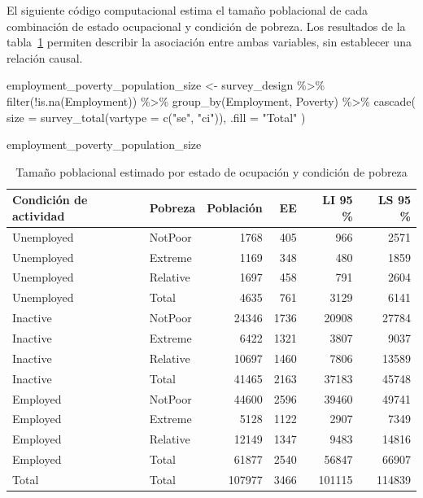 \documentclass[
  spanish,
  11pt,
  letterpaper,
  oneside,
  open=any]{scrbook}
\newenvironment{Shaded}{\begin{snugshade}}{\end{snugshade}}
\newcommand{\AttributeTok}[1]{\textcolor[rgb]{0.40,0.45,0.13}{#1}}
\newcommand{\FunctionTok}[1]{\textcolor[rgb]{0.28,0.35,0.67}{#1}}
\newcommand{\NormalTok}[1]{\textcolor[rgb]{0.00,0.23,0.31}{#1}}
\newcommand{\OtherTok}[1]{\textcolor[rgb]{0.00,0.23,0.31}{#1}}
\newcommand{\SpecialCharTok}[1]{\textcolor[rgb]{0.37,0.37,0.37}{#1}}
\newcommand{\StringTok}[1]{\textcolor[rgb]{0.13,0.47,0.30}{#1}}
\begin{document}
El siguiente código computacional estima el tamaño poblacional de cada
combinación de estado ocupacional y condición de pobreza. Los resultados
de la tabla~\ref{tbl-tamano-empleo-pobreza} permiten describir la
asociación entre ambas variables, sin establecer una relación causal.

\begin{Shaded}
\begin{Highlighting}[]
\NormalTok{employment\_poverty\_population\_size }\OtherTok{\textless{}{-}}\NormalTok{ survey\_design }\SpecialCharTok{\%\textgreater{}\%}
  \FunctionTok{filter}\NormalTok{(}\SpecialCharTok{!}\FunctionTok{is.na}\NormalTok{(Employment)) }\SpecialCharTok{\%\textgreater{}\%}
  \FunctionTok{group\_by}\NormalTok{(Employment, Poverty) }\SpecialCharTok{\%\textgreater{}\%}
  \FunctionTok{cascade}\NormalTok{(}
    \AttributeTok{size =} \FunctionTok{survey\_total}\NormalTok{(}\AttributeTok{vartype =} \FunctionTok{c}\NormalTok{(}\StringTok{"se"}\NormalTok{, }\StringTok{"ci"}\NormalTok{)),}
    \AttributeTok{.fill =} \StringTok{"Total"}
\NormalTok{  )}

\NormalTok{employment\_poverty\_population\_size}
\end{Highlighting}
\end{Shaded}

{

\begin{longtable}[]{@{}llrrrr@{}}

\caption{\label{tbl-tamano-empleo-pobreza}Tamaño poblacional estimado
por estado de ocupación y condición de pobreza}

\tabularnewline

\toprule\noalign{}
Condición de actividad & Pobreza & Población & EE & LI 95 \% & LS 95
\% \\
\midrule\noalign{}
\endhead
\bottomrule\noalign{}
\endlastfoot
Unemployed & NotPoor & 1768 & 405 & 966 & 2571 \\
Unemployed & Extreme & 1169 & 348 & 480 & 1859 \\
Unemployed & Relative & 1697 & 458 & 791 & 2604 \\
Unemployed & Total & 4635 & 761 & 3129 & 6141 \\
Inactive & NotPoor & 24346 & 1736 & 20908 & 27784 \\
Inactive & Extreme & 6422 & 1321 & 3807 & 9037 \\
Inactive & Relative & 10697 & 1460 & 7806 & 13589 \\
Inactive & Total & 41465 & 2163 & 37183 & 45748 \\
Employed & NotPoor & 44600 & 2596 & 39460 & 49741 \\
Employed & Extreme & 5128 & 1122 & 2907 & 7349 \\
Employed & Relative & 12149 & 1347 & 9483 & 14816 \\
Employed & Total & 61877 & 2540 & 56847 & 66907 \\
Total & Total & 107977 & 3466 & 101115 & 114839 \\

\end{longtable}

}
\end{document}
